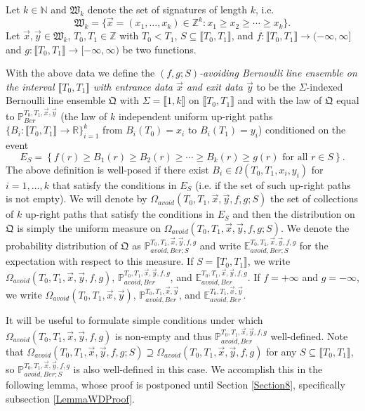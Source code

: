 \begin{definition}\label{DefAvoidingLawBer}
Let $k \in \mathbb{N}$ and $\mathfrak{W}_k$ denote the set of signatures of length $k$, i.e.
$$\mathfrak{W}_k = \{ \vec{x} = (x_1, \dots, x_k) \in \mathbb{Z}^k: x_1 \geq  x_2 \geq  \cdots \geq  x_k \}.$$
Let $\vec{x}, \vec{y} \in \mathfrak{W}_k$, $T_0, T_1 \in \mathbb{Z}$ with $T_0 < T_1$, $S\subseteq\llbracket T_0,T_1\rrbracket$, and $f: \llbracket T_0, T_1 \rrbracket \rightarrow (-\infty, \infty]$ and $g: \llbracket T_0, T_1 \rrbracket \rightarrow [-\infty, \infty)$ be two functions. 

With the above data we define the {\em $(f,g;S)$-avoiding Bernoulli line ensemble on the interval $\llbracket T_0, T_1 \rrbracket$ with entrance data $\vec{x}$ and exit data $\vec{y}$} to be the $\Sigma$-indexed Bernoulli line ensemble $\mathfrak{Q}$ with $\Sigma = \llbracket 1, k\rrbracket$ on $\llbracket T_0, T_1 \rrbracket$ and with the law of $\mathfrak{Q}$ equal to $\mathbb{P}^{T_0,T_1, \vec{x},\vec{y}}_{Ber}$ (the law of $k$ independent uniform up-right paths $\{B_i: \llbracket T_0, T_1 \rrbracket \rightarrow \mathbb{R} \}_{i = 1}^k$ from $B_i(T_0) = x_i$ to $B_i(T_1) = y_i$) conditioned on the event 
$$E_S  = \left\{ f(r) \geq B_1(r) \geq B_2(r) \geq \cdots \geq B_k(r) \geq g(r) \mbox{ for all $r \in S$} \right\}.$$ 
The above definition is well-posed if there exist $B_i \in \Omega(T_0,T_1,x_i,y_i)$ for $i = 1, \dots, k$ that satisfy the conditions in $E_S$ (i.e. if the set of such up-right paths is not empty). We will denote by $\Omega_{avoid}(T_0, T_1, \vec{x}, \vec{y}, f,g; S)$ the set of collections of $k$ up-right paths that satisfy the conditions in $E_S$ and then the distribution on $\mathfrak{Q}$ is simply the uniform measure on $\Omega_{avoid}(T_0, T_1, \vec{x}, \vec{y}, f,g; S)$. We denote the probability distribution of $\mathfrak{Q}$ as $\mathbb{P}_{avoid, Ber;S}^{T_0,T_1, \vec{x}, \vec{y}, f, g}$ and write $\mathbb{E}_{avoid, Ber; S}^{T_0, T_1, \vec{x}, \vec{y}, f, g}$ for the expectation with respect to this measure. If $S = \llbracket T_0,T_1\rrbracket$, we write $\Omega_{avoid}(T_0,T_1,\vec{x},\vec{y},f,g)$, $\mathbb{P}_{avoid, Ber}^{T_0,T_1, \vec{x}, \vec{y}, f, g}$, and $\mathbb{E}_{avoid, Ber}^{T_0, T_1, \vec{x}, \vec{y}, f, g}$. If $f=+\infty$ and $g=-\infty$, we write $\Omega_{avoid}(T_0,T_1,\vec{x},\vec{y})$, $\mathbb{P}^{T_0, T_1, \vec{x},\vec{y}}_{avoid, Ber}$, and $\mathbb{E}^{T_0, T_1, \vec{x},\vec{y}}_{avoid, Ber}$.
\end{definition}

It will be useful to formulate simple conditions under which $\Omega_{avoid}(T_0, T_1, \vec{x}, \vec{y}, f,g)$ is non-empty and thus $\mathbb{P}_{avoid, Ber}^{T_0,T_1, \vec{x}, \vec{y}, f, g}$ well-defined. Note that $\Omega_{avoid}(T_0, T_1, \vec{x}, \vec{y}, f, g; S) \supseteq \Omega_{avoid}(T_0, T_1, \vec{x}, \vec{y}, f,g)$ for any $S\subseteq\llbracket T_0, T_1\rrbracket$, so $\mathbb{P}_{avoid, Ber; S}^{T_0,T_1, \vec{x}, \vec{y}, f, g}$ is also well-defined in this case. We accomplish this in the following lemma, whose proof is postponed until Section \ref{Section8}, specifically subsection \ref{LemmaWDProof}.

